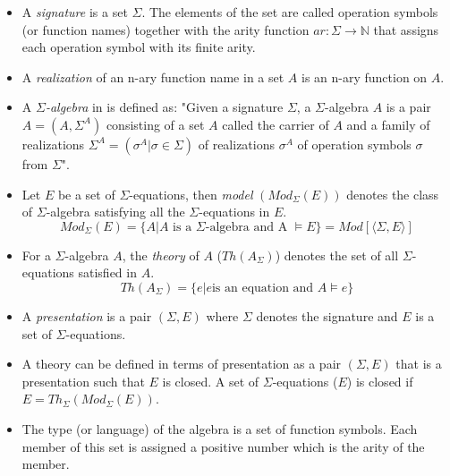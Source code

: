 \begin{itemize}

    \item A \textit{signature} is a set $\Sigma$. The elements of the set are
    called operation symbols (or function names) together with the arity
    function $ar: \Sigma \rightarrow \mathbb{N} $ that assigns each operation
    symbol with its finite arity.

    \item A \textit{realization} of an n-ary function name in a set $A$ is an
    n-ary function on $A$. 

    \item A \emph{$\Sigma$-algebra} in \cite{wechler2012universal} is defined
    as: "Given a signature $\Sigma$, a $\Sigma$-algebra $A$ is a pair $A =
    (A,\Sigma^{A})$ consisting of a set $A$ called the carrier of $A$ and a
    family of realizations $\Sigma^{A} = (\sigma^{A}|\sigma \in \Sigma)$ of
    realizations $\sigma^{A}$ of operation symbols $\sigma$ from $\Sigma$".

    \item Let $E$ be a set of $\Sigma$-equations, then \emph{model} $(Mod_\Sigma(E))$
    denotes the class of $\Sigma$-algebra satisfying all the $\Sigma$-equations
    in $E$.
    \[Mod_\Sigma(E) = \{ A | A \text{ is a } \Sigma\text{-algebra} \text{ and A
    } \models E \} = Mod[⟨\Sigma,E⟩]\]

    \item For a $\Sigma$-algebra $A$, the \emph{theory} of $A$ ($Th(A_\Sigma)$)
    denotes the set of all $\Sigma$-equations satisfied in $A$. \[Th(A_\Sigma) =
    \{ e | e \text{is an equation and }A \models e \}\]

    \item A \emph{presentation} is a pair $(\Sigma,E)$ where $\Sigma$ denotes
    the signature and $E$ is a set of $\Sigma$-equations.
    
    \item A theory can be defined in terms of presentation as a pair $(\Sigma,
    E)$ that is a presentation such that $E$ is closed. A set of
    $\Sigma$-equations ($E$) is closed if $E = Th_\Sigma(Mod_\Sigma(E))$.

    \item The type (or language) of the algebra is a set of function symbols.
    Each member of this set is assigned a positive number which is the arity of
    the member.
\end{itemize}

